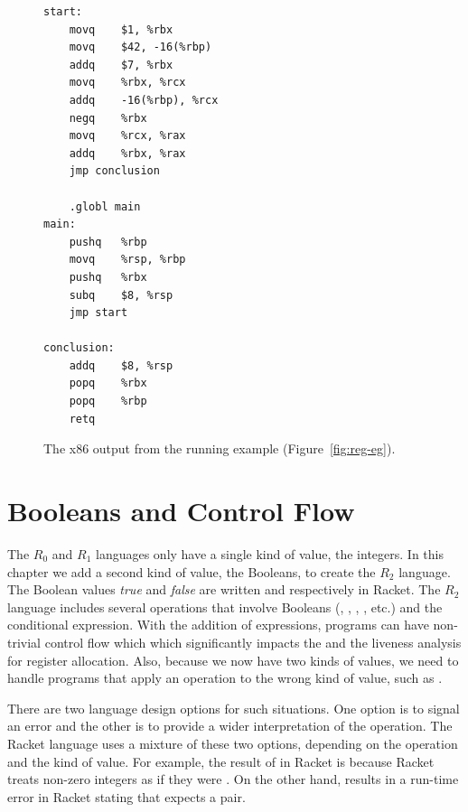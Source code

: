 \documentclass[11pt]{book}
\begin{document}
  
\begin{figure}[tbp]
\begin{lstlisting}
start:
	movq	$1, %rbx
	movq	$42, -16(%rbp)
	addq	$7, %rbx
	movq	%rbx, %rcx
	addq	-16(%rbp), %rcx
	negq	%rbx
	movq	%rcx, %rax
	addq	%rbx, %rax
	jmp conclusion

	.globl main
main:
	pushq	%rbp
	movq	%rsp, %rbp
	pushq	%rbx
	subq	$8, %rsp
	jmp start
        
conclusion:
	addq	$8, %rsp
	popq	%rbx
	popq	%rbp
	retq
\end{lstlisting}
\caption{The x86 output from the running example (Figure~\ref{fig:reg-eg}).}
\label{fig:running-example-x86}
\end{figure}



\chapter{Booleans and Control Flow}
\label{ch:bool-types}

The $R_0$ and $R_1$ languages only have a single kind of value, the
integers. In this chapter we add a second kind of value, the Booleans,
to create the $R_2$ language. The Boolean values \emph{true} and
\emph{false} are written  and  respectively in
Racket.  The $R_2$ language includes several operations that involve
Booleans (, , , \key{<}, etc.) and the
conditional  expression. With the addition of 
expressions, programs can have non-trivial control flow which which
significantly impacts the  and the liveness
analysis for register allocation. Also, because we now have two kinds
of values, we need to handle programs that apply an operation to the
wrong kind of value, such as .

There are two language design options for such situations.  One option
is to signal an error and the other is to provide a wider
interpretation of the operation. The Racket language uses a mixture of
these two options, depending on the operation and the kind of
value. For example, the result of  in Racket is
 because Racket treats non-zero integers as if they were
. On the other hand,  results in a run-time
error in Racket stating that  expects a pair.
\end{document}
